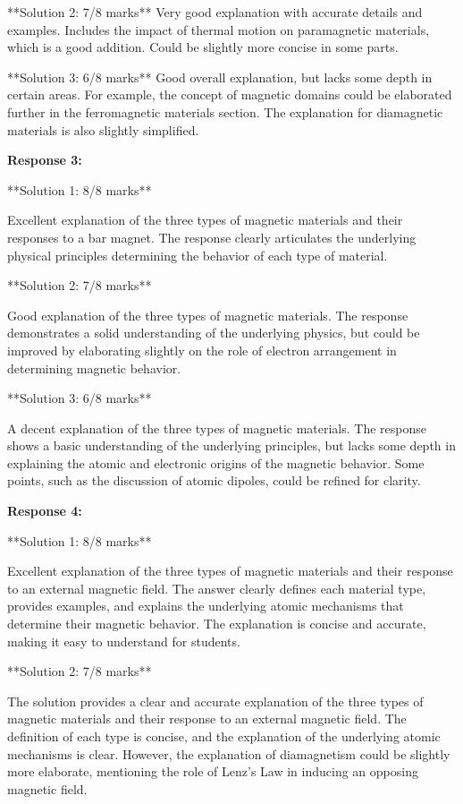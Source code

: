 \documentclass[a4paper,11pt]{article}
\begin{document}
**Solution 2: 7/8 marks**
Very good explanation with accurate details and examples. Includes the impact of thermal motion on paramagnetic materials, which is a good addition. Could be slightly more concise in some parts.

**Solution 3: 6/8 marks**
Good overall explanation, but lacks some depth in certain areas. For example, the concept of magnetic domains could be elaborated further in the ferromagnetic materials section. The explanation for diamagnetic materials is also slightly simplified.

\bigskip    
\textbf{Response 3:}

**Solution 1: 8/8 marks**

Excellent explanation of the three types of magnetic materials and their responses to a bar magnet. The response clearly articulates the underlying physical principles determining the behavior of each type of material.

**Solution 2: 7/8 marks**

Good explanation of the three types of magnetic materials. The response demonstrates a solid understanding of the underlying physics, but could be improved by elaborating slightly on the role of electron arrangement in determining magnetic behavior.

**Solution 3: 6/8 marks**

A decent explanation of the three types of magnetic materials. The response shows a basic understanding of the underlying principles, but lacks some depth in explaining the atomic and electronic origins of the magnetic behavior. Some points, such as the discussion of atomic dipoles, could be refined for clarity.

\bigskip    
\textbf{Response 4:}

**Solution 1: 8/8 marks**

Excellent explanation of the three types of magnetic materials and their response to an external magnetic field. The answer clearly defines each material type, provides examples, and explains the underlying atomic mechanisms that determine their magnetic behavior. The explanation is concise and accurate, making it easy to understand for students.

**Solution 2: 7/8 marks**

The solution provides a clear and accurate explanation of the three types of magnetic materials and their response to an external magnetic field. The definition of each type is concise, and the explanation of the underlying atomic mechanisms is clear. However, the explanation of diamagnetism could be slightly more elaborate, mentioning the role of Lenz's Law in inducing an opposing magnetic field.
\end{document}
